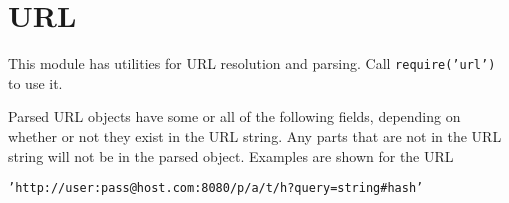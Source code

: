 \section{URL}\label{url}

\begin{Shaded}
\begin{Highlighting}[]
 
\end{Highlighting}
\end{Shaded}

This module has utilities for URL resolution and parsing. Call
\texttt{require('url')} to use it.

Parsed URL objects have some or all of the following fields, depending
on whether or not they exist in the URL string. Any parts that are not
in the URL string will not be in the parsed object. Examples are shown
for the URL

\texttt{'http://user:pass@host.com:8080/p/a/t/h?query=string\#hash'}


